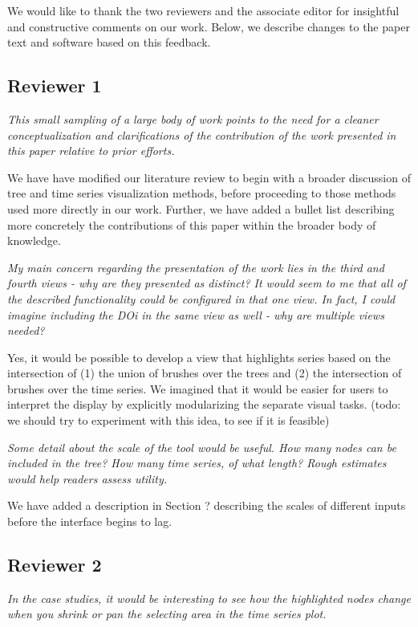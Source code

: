 \documentclass{article}
\begin{document}
We would like to thank the two reviewers and the associate editor for insightful
and constructive comments on our work. Below, we describe changes to the paper
text and software based on this feedback.

\subsection{Reviewer 1}

\textit{This small sampling of a large body of work points to the need for a
  cleaner conceptualization and clarifications of the contribution of the work
  presented in this paper relative to prior efforts.}

We have have modified our literature review to begin with a broader discussion
of tree and time series visualization methods, before proceeding to those
methods used more directly in our work. Further, we have added a bullet list
describing more concretely the contributions of this paper within the broader
body of knowledge.

\textit{My main concern regarding the presentation of the work lies in the third
  and fourth views - why are they presented as distinct? It would seem to me
  that all of the described functionality could be configured in that one view.
  In fact, I could imagine including the DOi in the same view as well - why are
  multiple views needed?}

Yes, it would be possible to develop a view that highlights series based on the
intersection of (1) the union of brushes over the trees and (2) the intersection
of brushes over the time series. We imagined that it would be easier for users
to interpret the display by explicitly modularizing the separate visual tasks.
(todo: we should try to experiment with this idea, to see if it is feasible)

\textit{Some detail about the scale of the tool would be useful. How many nodes
  can be included in the tree? How many time series, of what length? Rough
  estimates would help readers assess utility.}

We have added a description in Section ? describing the scales of different
inputs before the interface begins to lag.

\subsection{Reviewer 2}


\textit{In the case studies, it would be interesting to see how the highlighted
  nodes change when you shrink or pan the selecting area in the time series
  plot.}
\end{document}
